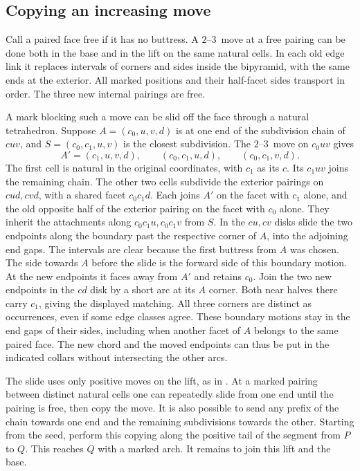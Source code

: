 \documentclass[11pt]{amsart}
\newcommand{\moveup}{\(2\)--\(3\)}
\begin{document}
\subsection{Copying an increasing move}

Call a paired face free if it has no buttress. A \moveup\ move at a free
pairing can be done both in the base and in the lift on the same natural
cells. In each old edge link it replaces intervals of corners and sides
inside the bipyramid, with the same ends at the exterior. All marked
positions and their half-facet sides transport in order. The three new
internal pairings are free.

A mark blocking such a move can be slid off the face through a natural
tetrahedron. Suppose \(A=(c_0,u,v,d)\) is at one end of the subdivision
chain of \(cuv\), and \(S=(c_0,c_1,u,v)\) is the closest subdivision.
The \moveup\ move on \(c_0uv\) gives
\[
          A'=(c_1,u,v,d),\qquad (c_0,c_1,u,d),\qquad (c_0,c_1,v,d).
\]
The first cell is natural in the original coordinates, with \(c_1\)
as its \(c\). Its \(c_1uv\) joins the remaining chain. The other two
cells subdivide the exterior pairings on \(cud,cvd\), with a shared
facet \(c_0c_1d\). Each joins \(A'\) on the facet with \(c_1\) alone,
and the old opposite half of the exterior pairing on the facet with
\(c_0\) alone. They inherit the attachments along \(c_0c_1u,c_0c_1v\)
from \(S\). In the \(cu,cv\) disks slide the two endpoints
along the boundary past the respective corner of \(A\), into the
adjoining end gaps. The intervals are clear because the first buttress
from \(A\) was chosen. The side towards \(A\) before the slide is the
forward side of this boundary motion. At the new endpoints it faces
away from \(A'\) and retains \(c_0\). Join the two new endpoints in the
\(cd\) disk by a short arc at its \(A\) corner. Both near halves there
carry \(c_1\), giving the displayed matching. All three corners are
distinct as occurrences, even if some edge classes agree. These boundary
motions stay in the end gaps of their sides, including when another
facet of \(A\) belongs to the same paired face. The new chord and the
moved endpoints can thus be put in the indicated collars without
intersecting the other arcs.

The slide uses only positive moves on the lift, as in
\cite[Lemma~11]{bh}. At a marked pairing between distinct natural cells
one can repeatedly slide from one end until the pairing is free, then
copy the move. It is also possible to send any prefix of the chain
towards one end and the remaining subdivisions towards the other.
Starting from the seed, perform this copying along the positive tail
of the segment from \(P\) to \(Q\). This reaches \(Q\) with a marked
arch. It remains to join this lift and the base.
\end{document}
